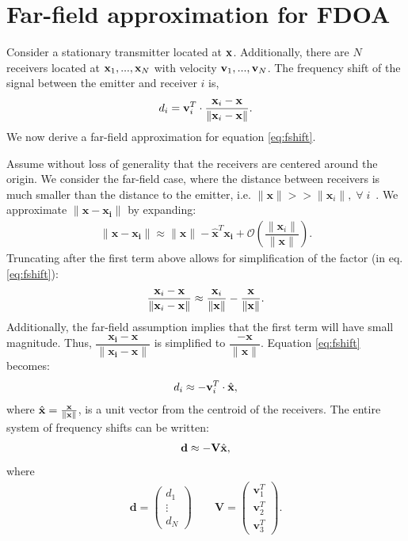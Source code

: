 \section{Far-field approximation for FDOA}
\label{s:FDOA}
Consider a stationary transmitter located at $\mathbf{x}$. Additionally, there are $N$ receivers located at $\mathbf{x}_1, ...,\mathbf{x}_N$ with velocity $\mathbf{v}_1, ...,\mathbf{v}_N$. The frequency shift of the signal between the emitter and receiver $i$ is,
\begin{align}
  \label{eq:fshift}
  d_i =  \mathbf{v}_i^T\cdot\frac{\mathbf{x}_i-\mathbf{x}}{\|\mathbf{x}_i-\mathbf{x}\|}.
\end{align}
We now derive a far-field approximation for equation \ref{eq:fshift}.

Assume without loss of generality that the receivers are centered around the origin. We consider the far-field case, where the distance between receivers is much smaller than the distance to the emitter, i.e. $\|\mathbf{x}\|>>\|\mathbf{x}_i\|, \; \forall \; i$~\cite{Cheney2009}. We approximate $\|\mathbf{x-x_i}\|$ by expanding:
\begin{align*}
  \|\mathbf{x-x_i}\| \approx \|\mathbf{x}\|-\hat{\mathbf{x}}^T\mathbf{x_i}+\mathcal{O}(\dfrac{\|\mathbf{x}_i\|}{\|\mathbf{x}\|}).
\end{align*}
Truncating after the first term above allows for simplification of the factor (in eq. \ref{eq:fshift}):
\begin{align*}
  \frac{\mathbf{x}_i-\mathbf{x}}{\|\mathbf{x}_i-\mathbf{x}\|} \approx \frac{\mathbf{x}_i}{\|\mathbf{x}\|}-\frac{\mathbf{x}}{\|\mathbf{x}\|}.
\end{align*}
Additionally, the far-field assumption implies that the first term will have small magnitude. Thus, $\dfrac{\mathbf{x_i-x}}{\|\mathbf{x_i-x}\|}$ is simplified to $\dfrac{-\mathbf{x}}{\|\mathbf{x}\|}$.
Equation \ref{eq:fshift} becomes:
\begin{align}
  d_i \approx  -\mathbf{v}_i^T\cdot\hat{\mathbf{x}},
\end{align}
where $\hat{\mathbf{x}} = \frac{\mathbf{x}}{\|\mathbf{x}\|}$, is a unit vector from the centroid of the receivers. The entire system of frequency shifts can be written:
\begin{align}
  \label{eq:fshiftFF}
\mathbf{d} \approx -\mathbf{V}\hat{\mathbf{x}},
\end{align}
where \begin{align*}
\mathbf{d}=\begin{pmatrix}
d_1 \\ \vdots \\ d_N
\end{pmatrix}
\qquad
\mathbf{V}=\begin{pmatrix}
\mathbf{v}_1^T \\ \mathbf{v}_2^T \\ \mathbf{v}_3^T
\end{pmatrix}.
\end{align*}

